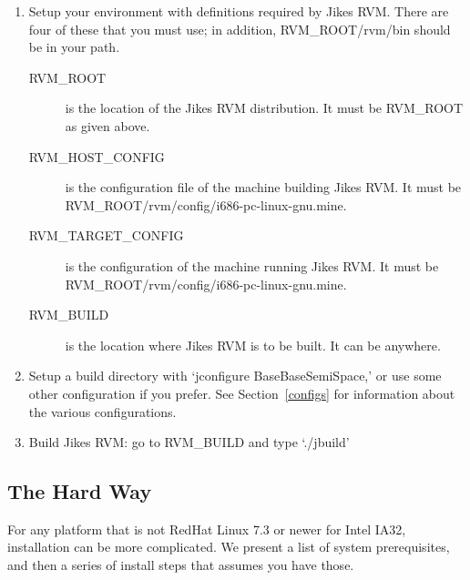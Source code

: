 \begin{enumerate}
\item Setup your environment with definitions required by Jikes RVM.
There are four of these that you must use; in addition,
RVM\_ROOT/rvm/bin should be in your path.
\begin{description}

\item[RVM\_ROOT] is the location of the Jikes RVM distribution.  It
must be RVM\_ROOT as given above.

\item[RVM\_HOST\_CONFIG] is the configuration file of the machine
building Jikes RVM.  It must be
RVM\_ROOT/rvm/config/i686-pc-linux-gnu.mine.

\item[RVM\_TARGET\_CONFIG] is the configuration of the machine running
Jikes RVM.  It must be RVM\_ROOT/rvm/config/i686-pc-linux-gnu.mine.

\item[RVM\_BUILD] is the location where Jikes RVM is to be built.  It
can be anywhere.
\end{description}

\item Setup a build directory with `jconfigure BaseBaseSemiSpace,' or
use some other configuration if you prefer. See Section~\ref{configs}
for information about the various configurations.

\item Build Jikes RVM: go to RVM\_BUILD and type `./jbuild'

\end{enumerate}

\newcommand{\gccURL}{ftp://ftp.gnu.org/gnu/gcc}
\newcommand{\glibcURL}{ftp://ftp.gnu.org/gnu/glibc}
\newcommand{\makeURL}{ftp://ftp.gnu.org/gnu/make}
\newcommand{\tarURL}{ftp://ftp.gnu.org/gnu/tar}
\newcommand{\autoconfURL}{ftp://ftp.gnu.org/gnu/autoconf}
\newcommand{\automakeURL}{ftp://ftp.gnu.org/gnu/automake}
\newcommand{\kshURL}{http://www.cs.mun.ca/~michael/pdksh}
\newcommand{\linuxPPCJDKURL}{http://www.ibm.com/java/jdk/linux/index.html}
\newcommand{\linuxKernelURL}{http://www.kernel.org}

\subsection{The Hard Way}

 For any platform that is not RedHat Linux 7.3 or newer for Intel
IA32, installation can be more complicated.  We present a list of system
prerequisites, and then a series of install steps that assumes you
have those.

